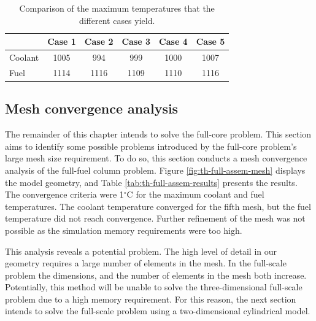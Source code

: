 \begin{table}[htbp!]
  \centering
  \caption{Comparison of the maximum temperatures that the different cases yield.}
  \label{tab:th-assem-flow-results}
\begin{tabular}{l|ccccc}
\toprule
        & Case 1 & Case 2 & Case 3 & Case 4 & Case 5 \\
\midrule
Coolant & 1005   &  994   &  999 & 1000 & 1007 \\
Fuel    & 1114   & 1116   & 1109 & 1110 & 1116 \\
\bottomrule
\end{tabular}
\end{table}

\subsection{Mesh convergence analysis}
\label{sec:meshconverge}

The remainder of this chapter intends to solve the full-core problem.
This section aims to identify some possible problems introduced by the full-core problem's large mesh size requirement.
To do so, this section conducts a mesh convergence analysis of the full-fuel column problem.
Figure \ref{fig:th-full-assem-mesh} displays the model geometry, and Table \ref{tab:th-full-assem-results} presents the results.
The convergence criteria were 1$^{\circ}$C for the maximum coolant and fuel temperatures.
The coolant temperature converged for the fifth mesh, but the fuel temperature did not reach convergence.
Further refinement of the mesh was not possible as the simulation memory requirements were too high.

This analysis reveals a potential problem.
The high level of detail in our geometry requires a large number of elements in the mesh.
In the full-scale problem the dimensions, and the number of elements in the mesh both increase.
Potentially, this method will be unable to solve the three-dimensional full-scale problem due to a high memory requirement.
For this reason, the next section intends to solve the full-scale problem using a two-dimensional cylindrical model.



